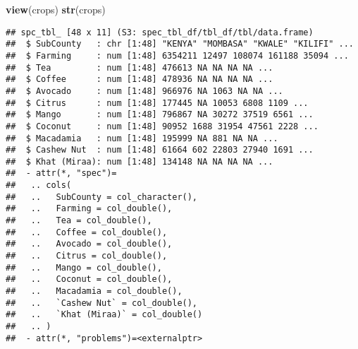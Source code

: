 \documentclass[
]{article}
\newenvironment{Shaded}{\begin{snugshade}}{\end{snugshade}}
\newcommand{\FunctionTok}[1]{\textcolor[rgb]{0.13,0.29,0.53}{\textbf{#1}}}
\newcommand{\NormalTok}[1]{#1}
\newcommand{\OtherTok}[1]{\textcolor[rgb]{0.56,0.35,0.01}{#1}}
\newcommand{\SpecialCharTok}[1]{\textcolor[rgb]{0.81,0.36,0.00}{\textbf{#1}}}
\begin{document}
\begin{Shaded}
\end{Shaded}

\begin{Shaded}
\begin{Highlighting}[]
\FunctionTok{view}\NormalTok{(crops)}
\FunctionTok{str}\NormalTok{(crops)}
\end{Highlighting}
\end{Shaded}

\begin{verbatim}
## spc_tbl_ [48 x 11] (S3: spec_tbl_df/tbl_df/tbl/data.frame)
##  $ SubCounty   : chr [1:48] "KENYA" "MOMBASA" "KWALE" "KILIFI" ...
##  $ Farming     : num [1:48] 6354211 12497 108074 161188 35094 ...
##  $ Tea         : num [1:48] 476613 NA NA NA NA ...
##  $ Coffee      : num [1:48] 478936 NA NA NA NA ...
##  $ Avocado     : num [1:48] 966976 NA 1063 NA NA ...
##  $ Citrus      : num [1:48] 177445 NA 10053 6808 1109 ...
##  $ Mango       : num [1:48] 796867 NA 30272 37519 6561 ...
##  $ Coconut     : num [1:48] 90952 1688 31954 47561 2228 ...
##  $ Macadamia   : num [1:48] 195999 NA 881 NA NA ...
##  $ Cashew Nut  : num [1:48] 61664 602 22803 27940 1691 ...
##  $ Khat (Miraa): num [1:48] 134148 NA NA NA NA ...
##  - attr(*, "spec")=
##   .. cols(
##   ..   SubCounty = col_character(),
##   ..   Farming = col_double(),
##   ..   Tea = col_double(),
##   ..   Coffee = col_double(),
##   ..   Avocado = col_double(),
##   ..   Citrus = col_double(),
##   ..   Mango = col_double(),
##   ..   Coconut = col_double(),
##   ..   Macadamia = col_double(),
##   ..   `Cashew Nut` = col_double(),
##   ..   `Khat (Miraa)` = col_double()
##   .. )
##  - attr(*, "problems")=<externalptr>
\end{verbatim}
\end{document}
